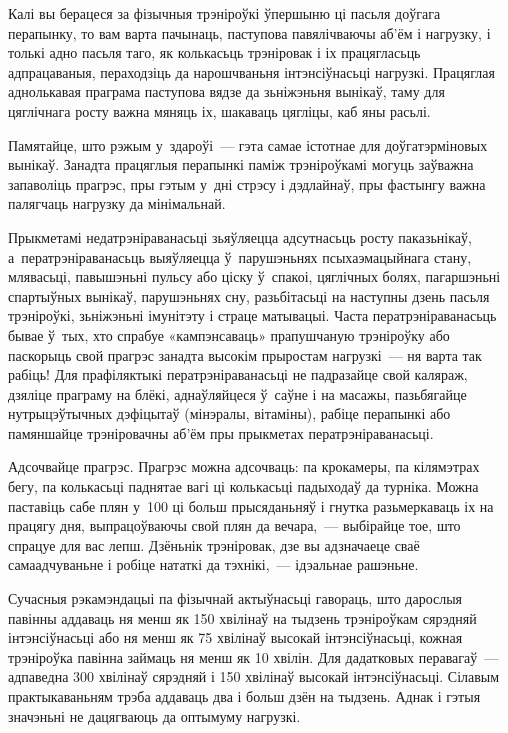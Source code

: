 Калі вы берацеся за фізычныя трэніроўкі ўпершыню ці пасьля доўгага перапынку, то вам варта пачынаць, паступова павялічваючы аб'ём і нагрузку, і толькі адно пасьля таго, як колькасьць трэніровак і іх працягласьць адпрацаваныя, пераходзіць да нарошчваньня інтэнсіўнасьці нагрузкі. Працяглая аднолькавая праграма паступова вядзе да зьніжэньня вынікаў, таму для цяглічнага росту важна мяняць іх, шакаваць цягліцы, каб яны расьлі. 

Памятайце, што рэжым у~здароўі~--- гэта самае істотнае для доўгатэрміновых вынікаў. Занадта працяглыя перапынкі паміж трэніроўкамі могуць заўважна запаволіць прагрэс, пры гэтым у~дні стрэсу і дэдлайнаў, пры фастынгу важна палягчаць нагрузку да мінімальнай.

Прыкметамі недатрэніраванасьці зьяўляецца адсутнасьць росту паказьнікаў, а~ператрэніраванасьць выяўляецца ў~парушэньнях псыхаэмацыйнага стану, млявасьці, павышэньні пульсу або ціску ў~спакоі, цяглічных болях, пагаршэньні спартыўных вынікаў, парушэньнях сну, разьбітасьці на наступны дзень пасьля трэніроўкі, зьніжэньні імунітэту і страце матывацыі. Часта ператрэніраванасьць бывае ў~тых, хто спрабуе «кампэнсаваць» прапушчаную трэніроўку або паскорыць свой прагрэс занадта высокім прыростам нагрузкі~--- ня варта так рабіць! Для прафіляктыкі ператрэніраванасьці не падразайце свой каляраж, дзяліце праграму на блёкі, аднаўляйцеся ў~саўне і на масажы, пазьбягайце нутрыцэўтычных дэфіцытаў (мінэралы, вітаміны), рабіце перапынкі або памяншайце трэніровачны аб'ём пры прыкметах ператрэніраванасьці.

Адсочвайце прагрэс. Прагрэс можна адсочваць: па крокамеры, па кілямэтрах бегу, па колькасьці паднятае вагі ці колькасьці падыходаў да турніка. Можна паставіць сабе плян у~100 ці больш прысяданьняў і гнутка разьмеркаваць іх на працягу дня, выпрацоўваючы свой плян да вечара,~--- выбірайце тое, што спрацуе для вас лепш. Дзёньнік трэніровак, дзе вы адзначаеце сваё самаадчуваньне і робіце нататкі да тэхнікі,~--- ідэальнае рашэньне.

Сучасныя рэкамэндацыі па фізычнай актыўнасьці гавораць, што дарослыя павінны аддаваць ня менш як 150 хвілінаў на тыдзень трэніроўкам сярэдняй інтэнсіўнасьці або ня менш як 75 хвілінаў высокай інтэнсіўнасьці, кожная трэніроўка павінна займаць ня менш як 10 хвілін. Для дадатковых перавагаў~--- адпаведна 300 хвілінаў сярэдняй і 150 хвілінаў высокай інтэнсіўнасьці. Сілавым практыкаваньням трэба аддаваць два і больш дзён на тыдзень. Аднак і гэтыя значэньні не дацягваюць да оптымуму нагрузкі.

